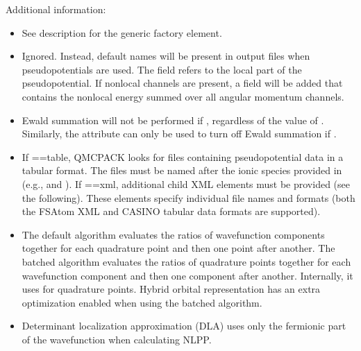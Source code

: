 \documentclass[letterpaper,10pt,english]{sphinxmanual}
\begin{document}
Additional information:
\begin{itemize}
\item {} 
 See description for the generic 
factory element.

\item {} 
 Ignored. Instead, default names will be present in
 output files when pseudopotentials are used. The
field  refers to the local part of the pseudopotential.
If nonlocal channels are present, a  field will be
added that contains the nonlocal energy summed over all angular
momentum channels.

\item {} 
 Ewald summation will not be performed if
, regardless of the value of
. Similarly, the  attribute can only be used to turn
off Ewald summation if .

\item {} 
 If ==table, QMCPACK looks for  files
containing pseudopotential data in a tabular format. The files must
be named after the ionic species provided in  (e.g.,
 and ). If ==xml, additional
 child XML elements must be provided (see the following).
These elements specify individual file names and formats (both the
FSAtom XML and CASINO tabular data formats are supported).

\item {} 
 The default algorithm evaluates the ratios of
wavefunction components together for each quadrature point and then
one point after another. The batched algorithm evaluates the ratios
of quadrature points together for each wavefunction component and
then one component after another. Internally, it uses
 for quadrature points. Hybrid orbital
representation has an extra optimization enabled when using the
batched algorithm.

\item {} 
 Determinant localization approximation
(DLA)  uses only the fermionic part of
the wavefunction when calculating NLPP.

\end{itemize}
\end{document}

